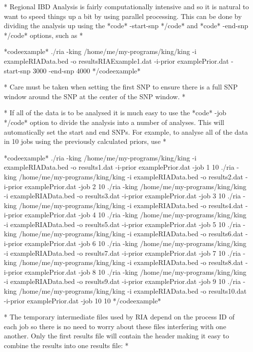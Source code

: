*
Regional IBD Analysis is fairly computationally intensive and so it is natural to want to speed things up a bit by using parallel processing. This can be done by dividing the analysis up using the *code* -start-snp */code* and *code* -end-snp */code* options, such as
*


*codeexample*
./ria -king /home/me/my-programs/king/king -i exampleRIAData.bed -o resultsRIAExample1.dat -i-prior examplePrior.dat -start-snp 3000 -end-snp 4000
*/codeexample*

*
Care must be taken when setting the first SNP to ensure there is a full SNP window around the SNP at the center of the SNP window.
*

*
If all of the data is to be analysed it is much easy to use the *code* -job */code* option to divide the analysis into a number of analyses. This will automatically set the start and end SNPs. For example, to analyse all of the data in 10 jobs using the previously calculated priors, use
*

*codeexample*
./ria -king /home/me/my-programs/king/king -i exampleRIAData.bed -o results1.dat -i-prior examplePrior.dat -job 1 10
./ria -king /home/me/my-programs/king/king -i exampleRIAData.bed -o results2.dat -i-prior examplePrior.dat -job 2 10
./ria -king /home/me/my-programs/king/king -i exampleRIAData.bed -o results3.dat -i-prior examplePrior.dat -job 3 10
./ria -king /home/me/my-programs/king/king -i exampleRIAData.bed -o results4.dat -i-prior examplePrior.dat -job 4 10
./ria -king /home/me/my-programs/king/king -i exampleRIAData.bed -o results5.dat -i-prior examplePrior.dat -job 5 10
./ria -king /home/me/my-programs/king/king -i exampleRIAData.bed -o results6.dat -i-prior examplePrior.dat -job 6 10
./ria -king /home/me/my-programs/king/king -i exampleRIAData.bed -o results7.dat -i-prior examplePrior.dat -job 7 10
./ria -king /home/me/my-programs/king/king -i exampleRIAData.bed -o results8.dat -i-prior examplePrior.dat -job 8 10
./ria -king /home/me/my-programs/king/king -i exampleRIAData.bed -o results9.dat -i-prior examplePrior.dat -job 9 10
./ria -king /home/me/my-programs/king/king -i exampleRIAData.bed -o results10.dat -i-prior examplePrior.dat -job 10 10
*/codeexample*

*
The temporary intermediate files used by RIA depend on the process ID of each job so there is no need to worry about these files interfering with one another.  
Only the first results file will contain the header making it easy to combine the results into one results file:
*


